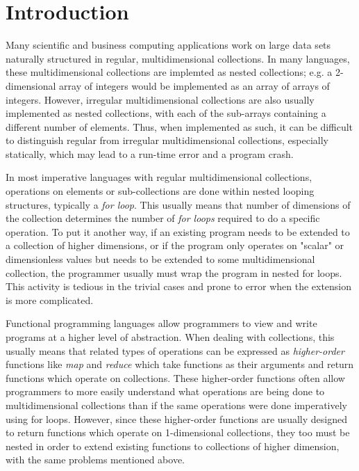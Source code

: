 \chapter{Introduction}
Many scientific and business computing applications work on large data sets naturally structured in regular, multidimensional collections.
In many languages, these multidimensional collections are implemted as nested collections; e.g. a 2-dimensional array of integers would be implemented as an array of arrays of integers.
However, irregular multidimensional collections are also usually implemented as nested collections, with each of the sub-arrays containing a different number of elements.
Thus, when implemented as such, it can be difficult to distinguish regular from irregular multidimensional collections, especially statically, which may lead to a run-time error and a program crash.

In most imperative languages with regular multidimensional collections, operations on elements or sub-collections are done within nested looping structures, typically a \textit{for loop}.
This usually means that number of dimensions of the collection determines the number of \textit{for loops} required to do a specific operation.
To put it another way, if an existing program needs to be extended to a collection of higher dimensions, or if the program only operates on "scalar" or dimensionless values but needs to be extended to some multidimensional collection, the programmer usually must wrap the program in nested for loops.
This activity is tedious in the trivial cases and prone to error when the extension is more complicated.

Functional programming languages allow programmers to view and write programs at a higher level of abstraction.
When dealing with collections, this usually means that related types of operations can be expressed as \textit{higher-order} functions like \textit{map} and \textit{reduce} which take functions as their arguments and return functions which operate on collections.
These higher-order functions often allow programmers to more easily understand what operations are being done to multidimensional collections than if the same operations were done imperatively using for loops.
However, since these higher-order functions are usually designed to return functions which operate on 1-dimensional collections, they too must be nested in order to extend existing functions to collections of higher dimension, with the same problems mentioned above.

